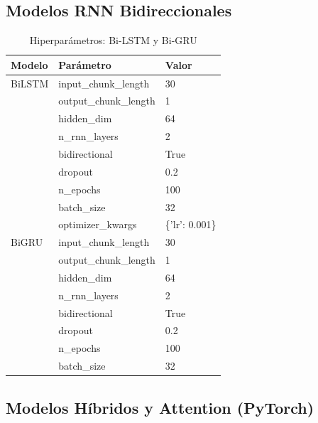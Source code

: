 \subsection{Modelos RNN Bidireccionales}
\label{app:rnn_hyperparams}

\begin{table}[htbp]
\centering
\caption{Hiperpar\'ametros: Bi-LSTM y Bi-GRU}
\label{tab:hyper_rnn}
\small
\begin{tabular}{@{}llp{6cm}@{}}
\toprule
\textbf{Modelo} & \textbf{Par\'ametro} & \textbf{Valor} \\
\midrule
BiLSTM & input\_chunk\_length & 30 \\
 & output\_chunk\_length & 1 \\
 & hidden\_dim & 64 \\
 & n\_rnn\_layers & 2 \\
 & bidirectional & True \\
 & dropout & 0.2 \\
 & n\_epochs & 100 \\
 & batch\_size & 32 \\
 & optimizer\_kwargs & \{'lr': 0.001\} \\
\midrule
BiGRU & input\_chunk\_length & 30 \\
 & output\_chunk\_length & 1 \\
 & hidden\_dim & 64 \\
 & n\_rnn\_layers & 2 \\
 & bidirectional & True \\
 & dropout & 0.2 \\
 & n\_epochs & 100 \\
 & batch\_size & 32 \\
\bottomrule
\end{tabular}
\end{table}

\subsection{Modelos H\'ibridos y Attention (PyTorch)}
\label{app:hybrid_hyperparams}

